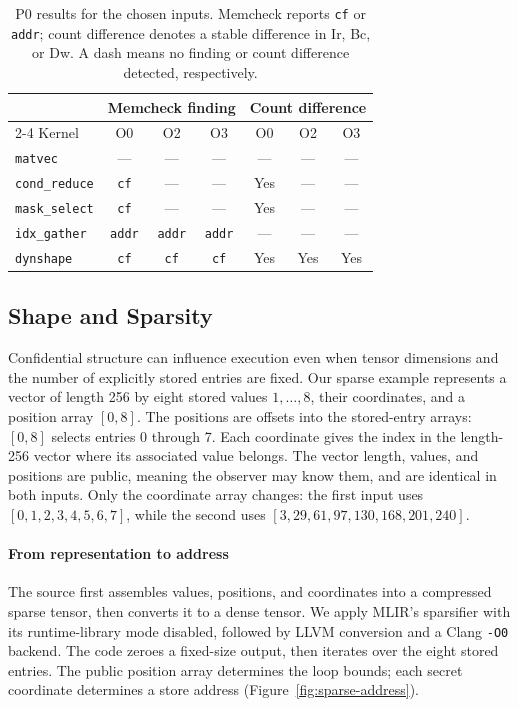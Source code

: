\begin{table}[t]
\caption{P0 results for the chosen inputs. Memcheck reports \texttt{cf} or \texttt{addr}; count difference denotes a stable difference in Ir, Bc, or Dw. A dash means no finding or count difference detected, respectively.}
\label{tab:section3-core}
\centering
\footnotesize
\setlength{\tabcolsep}{3pt}
\begin{tabular}{@{}lcccccc@{}}
\hline
& \multicolumn{3}{c}{Memcheck finding} & \multicolumn{3}{c}{Count difference} \\
\cline{2-4}\cline{5-7}
Kernel & O0 & O2 & O3 & O0 & O2 & O3 \\
\hline
\texttt{matvec} & --- & --- & --- & --- & --- & --- \\
\texttt{cond\_reduce} & \texttt{cf} & --- & --- & Yes & --- & --- \\
\texttt{mask\_select} & \texttt{cf} & --- & --- & Yes & --- & --- \\
\texttt{idx\_gather} & \texttt{addr} & \texttt{addr} & \texttt{addr} & --- & --- & --- \\
\texttt{dynshape} & \texttt{cf} & \texttt{cf} & \texttt{cf} & Yes & Yes & Yes \\
\hline
\end{tabular}
\end{table}

\subsection{Shape and Sparsity}
\label{sec:evaluation:structure}

Confidential structure can influence execution even when tensor dimensions and the number of explicitly stored entries are fixed.
Our sparse example represents a vector of length 256 by eight stored values \(1,\ldots,8\), their coordinates, and a position array \([0,8]\).
The positions are offsets into the stored-entry arrays: \([0,8]\) selects entries 0 through 7.
Each coordinate gives the index in the length-256 vector where its associated value belongs.
The vector length, values, and positions are public, meaning the observer may know them, and are identical in both inputs.
Only the coordinate array changes: the first input uses \([0,1,2,3,4,5,6,7]\), while the second uses \([3,29,61,97,130,168,201,240]\).

\paragraph{From representation to address}
The source first assembles values, positions, and coordinates into a compressed sparse tensor, then converts it to a dense tensor.
We apply MLIR's sparsifier with its runtime-library mode disabled, followed by LLVM conversion and a Clang \texttt{-O0} backend.
The code zeroes a fixed-size output, then iterates over the eight stored entries.
The public position array determines the loop bounds; each secret coordinate determines a store address (Figure~\ref{fig:sparse-address}).

